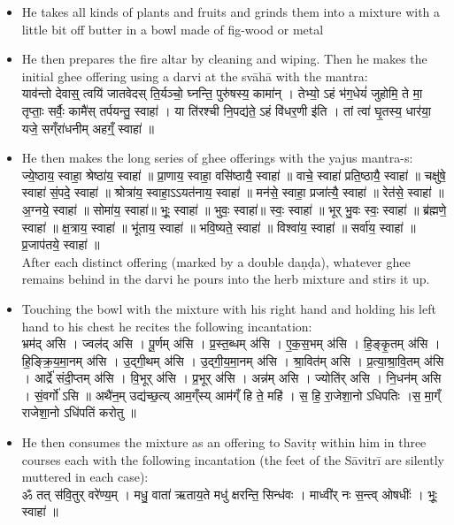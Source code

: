 \documentclass[12pt]{article}
\begin{document}
\begin{enumerate}
\begin{itemize}
\item He takes all kinds of plants and fruits and grinds them into a mixture with a little bit off butter in a bowl made of fig-wood or metal
\item He then prepares the fire altar by cleaning and wiping. Then he makes the initial ghee offering using a darvi at the svāhā with the mantra:\\[8pt]
{\skt याव॑न्तो देवास्॒ त्वयि॑ जातवेदस् ति॒र्यञ्चो॒ घ्नन्ति॒ पुरु॑षस्य॒ कामा॑न् । तेभ्यो॒ ऽहं भ॑ग॒धेयं॑ जुहोमि॒ ते मा॒ तृप्ताः॒ सर्वैः॒ कामै॑स् तर्पयन्तु॒ स्वाहा॑ । या ति॑रश्ची नि॒पद्य॑ते॒ ऽहं वि॑धर॒णी इ॑ति । तां त्वा॑ घृ॒तस्य॒ धार॑या॒ यजे॒ सग्ँरा॑धनीम् अहग्ँ॒ स्वाहा॑ ॥
}
\item He then makes the long series of ghee offerings  with the yajus mantra-s:\\[8pt]
{\skt ज्ये॒ष्ठाय॒ स्वाहा॒ श्रेष्ठा॑य॒ स्वाहा॑ ॥ प्रा॒णाय॒ स्वाहा॒ वसि॑ष्ठायै॒ स्वाहा॑ ॥ वाचे॒ स्वाहा॑ प्रति॒ष्ठायै॒ स्वाहा॑ ॥ चक्षु॑षे॒ स्वाहा॑ सं॒पदे॒ स्वाहा॑ ॥ श्रोत्रा॑य॒ स्वाहा॒ऽऽयत॑नाय॒ स्वाहा॑ ॥ मन॑से॒ स्वाहा॒ प्रजा॑त्यै॒ स्वाहा॑ ॥ रेत॑से॒ स्वाहा॑ ॥ अ॒ग्नये॒ स्वाहा॑ ॥ सोमा॑य॒ स्वाहा॑॥ भूः॒ स्वाहा॑ ॥ भुवः॒ स्वाहा॑॥ स्वः॒ स्वाहा॑ ॥ भूर् भु॒वः स्वः॒ स्वाहा॑ ॥ ब्र॑ह्मणे॒ स्वाहा॑ ॥ क्ष॒त्राय॒ स्वाहा॑ ॥ भू॑ताय॒ स्वाहा॑ ॥ भवि॒ष्यते॒ स्वाहा॑ ॥ विश्वा॑य॒ स्वाहा॑ ॥ सर्वा॑य॒ स्वाहा॑ ॥ प्र॒जाप॑तये॒ स्वाहा॑ ॥
}\\[8pt]
After each distinct offering (marked by a double daṇḍa), whatever ghee remains behind in the darvi he pours into the herb mixture and stirs it  up. 
\item Touching the bowl with the mixture with his right hand and holding his left hand to his chest he recites the following incantation:\\[8pt]
{\skt भ्रम॑द् असि । ज्वल॑द् असि । पू॒र्णम् अ॑सि । प्र॒स्त॒ब्धम् अ॑सि । ए॒क॒स॒भम् अ॑सि । हि॒ङ्कृ॒तम् अ॑सि । हि॒ङ्क्रि॒य॒मा॒नम् अ॑सि । उ॒द्गी॒थम् अ॑सि । उ॒द्गी॒य॒मा॒नम् अ॑सि । श्रा॒वित॑म् असि । प्र॒त्या॒श्रा॒वि॒तम् अ॑सि । आर्द्रे॑ संदी॒प्तम् अ॑सि । वि॒भूर् अ॑सि । प्र॒भूर् अ॑सि । अन्न॑म् असि । ज्योति॑र् असि । नि॒धन॑म् असि । सं॒वर्गो॑ ऽसि ॥ अथै॑न॒म् उद्य॑च्छ॒त्य् आम॒ग्ँस्य् आम॑ग्ँ हि ते॒ महि॑ । स॒ हि॒ रा॒जेशा॒नो ऽधिपतिः ।स॒ मा॒ग्ँ राजेशा॒नो ऽधि॑पतिं करोतु ॥
}
\item He then consumes the mixture as an offering to Savitṛ within him in three courses each with the following incantation (the feet of the Sāvitrī are silently muttered in each case):\\[8pt]
{\skt ॐ तत् स॑वि॒तुर् वरे॑ण्य॒म् । मधु॒ वाता॑ ऋताय॒ते मधु॑ क्षरन्ति॒ सिन्ध॑वः । माध्वी॑र् नः स॒न्त्व् ओषधीः॑ । भूः॒ स्वाहा॑ ॥
}
\end{itemize}
\end{enumerate}
\end{document}
